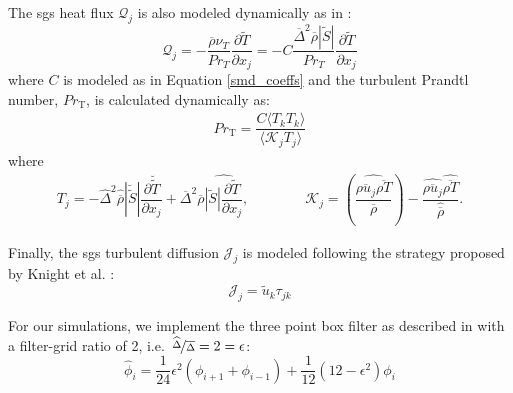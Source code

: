 The \gls{sgs} heat flux $\mathcal{Q}_j$ is also modeled dynamically as in \cite{LES_Comp}:
\begin{equation} \label{sgs_heat_flux}
\mathcal{Q}_j = - \dfrac{\overline{\rho}\nu_T}{Pr_T} \dfrac{\partial \widetilde{T}}{\partial x_j} = - C\dfrac{\overline{\Delta}^2 \overline{\rho}  |\widetilde{S}|}{Pr_T} \dfrac{\partial \widetilde{T}}{\partial x_j} 
\end{equation}
where $C$ is modeled as in Equation \ref{smd_coeffs} and the turbulent Prandtl number, $Pr_\text{T}$, is calculated dynamically as:
\begin{equation}
\begin{aligned}
	Pr_\text{T} = \dfrac{C \langle T_k T_k  \rangle}{\langle \mathcal{K}_j T_j \rangle}
\end{aligned}
\end{equation}
where 
\begin{equation}
\begin{aligned}
	T_j = - \widehat{\Delta}^2  \widehat{\overline{\rho}} |\breve{\widetilde{S}}| \dfrac{\partial \breve{\widetilde{T}}}{\partial x_j} +  \overline{\Delta}^2  \overline{\rho} \widehat{|\widetilde{S}| \dfrac{\partial \widetilde{T}}{\partial x_j}}, \qquad \qquad \mathcal{K}_j = \left( \dfrac{ \widehat{\overline{\rho u_j} \overline{\rho T}}}{\overline{\rho}} \right) - \dfrac{ \widehat{\overline{\rho u_j}} \widehat{ \overline{\rho T}}}{\widehat{\overline{\rho}}}.
\end{aligned}
\end{equation}

Finally, the \gls{sgs} turbulent diffusion $\mathcal{J}_j$ is modeled following the strategy proposed by Knight et al. \cite{}:
\begin{equation} \label{sgs_turb_diff}
\mathcal{J}_j = \widetilde{u}_k \tau_{jk}
\end{equation}

For our simulations, we implement the three point box filter as described in \cite{filter} with a filter-grid ratio of 2, i.e.\  $\nicefrac{\widehat{\Delta}}{\overline{\Delta}}=2 = \epsilon$: 
\begin{equation}
\widehat{\phi}_i = \dfrac{1}{24} \epsilon^2 \left( \phi_{i+1} + \phi_{i-1} \right) + \dfrac{1}{12} \left(12- \epsilon^2 \right) \phi_i 
\end{equation}



